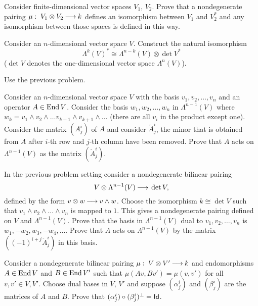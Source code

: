 \documentclass[12pt]{article}
\begin{document}
\begin{zadacha} 
Consider finite-dimensional vector spaces $V_1$, $V_2$.
Prove that a nondegenerate pairing $\mu:\; V_1 \otimes V_2 {\:\longrightarrow\:} k$
defines an isomorphism between $V_1$ and $V_2^*$ and any isomorphism
between those spaces is defined in this way.
\end{zadacha}

\begin{zadacha}[!]
Consider an $n$-dimensional vector space $V$.
Construct the natural isomorphism
\[
\Lambda^k(V)^*\cong\Lambda^{n-k}(V)\otimes \det V^*
\]
($\det V$ denotes the one-dimensional vector space
$\Lambda^{n}(V)$).
\end{zadacha}

\begin{ukazanie}
Use the previous problem.
\end{ukazanie}

\begin{zadacha}
Consider an $n$-dimensional vector space $V$ with the basis
 $v_1, v_2, \dots, v_n$ and an operator $A\in \operatorname{End} V$.
Consider the basis $w_1, w_2, \dots, w_n$ 
in $\Lambda^{n-1}(V)$ where
$w_k= v_1\wedge v_2 \wedge \dots v_{k-1}\wedge v_{k+1}
\wedge \dots$
(there are all $v_i$ in the product except one). 
Consider the matrix $(A^i_j)$ of $A$ and consider 
$\check A^i_j$, the minor that is obtained from 
$A$ after $i$-th row and $j$-th column have been removed. 
Prove that $A$ acts on $\Lambda^{n-1}(V)$ as the matrix 
 $(\check A^i_j)$.
\end{zadacha}

\begin{zadacha} 
In the previous problem setting consider a nondegenerate bilinear
pairing 
\[ 
V \otimes \Lambda^{n-1}(V) {\:\longrightarrow\:} \det V,
\]
defined by the form $v\otimes w {\:\longrightarrow\:} v\wedge w$.  Choose the
isomorphism $k \cong \det V$ such that $v_1\wedge v_2 \wedge \dots
\wedge v_n$ is mapped to $1$. This gives a nondegenerate pairing
defined on $V$ and $\Lambda^{n-1}(V)$. Prove that the basis in
$\Lambda^{n-1}(V)$ dual to $v_1, v_2, \dots, v_n$ is $w_1, -w_2, w_3,
-w_4, \dots $.  Prove that $A$ acts on $\Lambda^{n-1}(V)$ by the
matrix $((-1)^{i+j}\check A^i_j)$ in this basis.
\end{zadacha}

\begin{zadacha} 
Consider a nondegenerate bilinear pairing $\mu:\; V \otimes V'{\:\longrightarrow\:}
k$ and endomorphisms $A\in \operatorname{End} V$ and $B\in \operatorname{End} V'$ such that
$\mu(A v, B v') = \mu(v,  v')$ for all $v, v'\in V, V'$. Choose dual
bases in $V$, $V'$ and suppose $(\alpha^i_j)$ and
$(\beta^i_j)$ are the matrices of $A$ and $B$. Prove that
$(\alpha^i_j)\circ (\beta^i_j)^\bot =\operatorname{\sf Id}$.
\end{zadacha}
\end{document}
